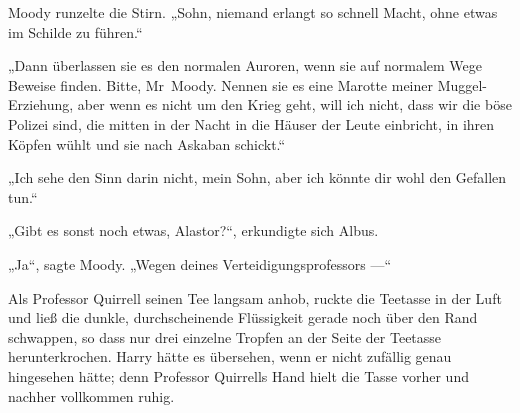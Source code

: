 Moody runzelte die Stirn.
„Sohn, niemand erlangt so schnell Macht, ohne etwas im Schilde zu führen.“

„Dann überlassen sie es den normalen Auroren, wenn sie auf normalem Wege Beweise finden. Bitte, Mr~Moody. Nennen sie es eine Marotte meiner Muggel-Erziehung, aber wenn es nicht um den Krieg geht, will ich nicht, dass wir die böse Polizei sind, die mitten in der Nacht in die Häuser der Leute einbricht, in ihren Köpfen wühlt und sie nach Askaban schickt.“

„Ich sehe den Sinn darin nicht, mein Sohn, aber ich könnte dir wohl den Gefallen tun.“

„Gibt es sonst noch etwas, Alastor?“, erkundigte sich Albus.

„Ja“, sagte Moody.
„Wegen deines Verteidigungsprofessors —“



Als Professor Quirrell seinen Tee langsam anhob, ruckte die Teetasse in der Luft und ließ die dunkle, durchscheinende Flüssigkeit gerade noch über den Rand schwappen, so dass nur drei einzelne Tropfen an der Seite der Teetasse herunterkrochen.
Harry hätte es übersehen, wenn er nicht zufällig genau hingesehen hätte; denn Professor Quirrells Hand hielt die Tasse vorher und nachher vollkommen ruhig.

